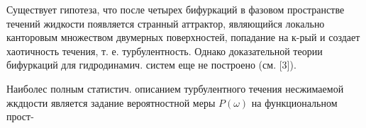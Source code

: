 \documentclass[10pt]{article}
\begin{document}
Существует гипотеза, что после четырех бифуркаций в фазовом пространстве течений жидкости появляется странный аттрактор, являющийся локально канторовым множеством двумерных поверхностей, попадание на к-рый и создает хаотичность течения, т. е. турбулентность. Однако доказательной теории бифуркаций для гидродинамич. систем еще не построено (см. [3]).



Наиболес полным статистич. описанием турбулентного течения несжимаемой жкдцости является задание вероятностной меры $P(\omega)$ на функциональном прост-
\end{document}
